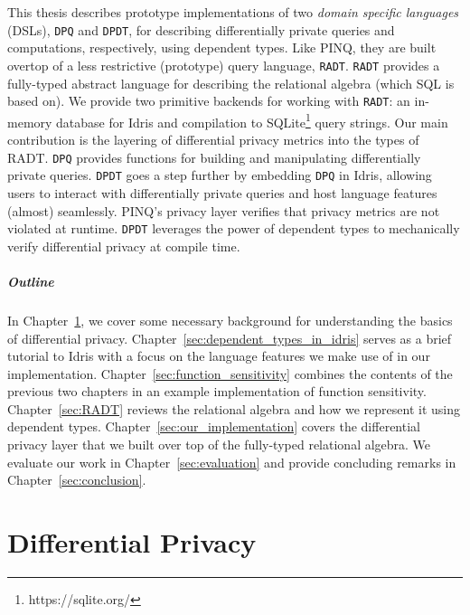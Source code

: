 \documentclass[12pt]{report}
\begin{document}
This thesis describes prototype implementations of two \textit{domain specific languages} (DSLs), \texttt{DPQ} and \texttt{DPDT}, for describing differentially private queries and computations, respectively, using dependent types.
Like PINQ, they are built overtop of a less restrictive (prototype) query language, \texttt{RADT}.
\texttt{RADT} provides a fully-typed abstract language for describing the relational algebra (which SQL is based on).
We provide two primitive backends for working with \texttt{RADT}: an in-memory database for Idris and compilation to SQLite\footnote{https://sqlite.org/} query strings.
Our main contribution is the layering of differential privacy metrics into the types of RADT.
\texttt{DPQ} provides functions for building and manipulating differentially private queries.
\texttt{DPDT} goes a step further by embedding \texttt{DPQ} in Idris, allowing users to interact with differentially private queries and host language features (almost) seamlessly.
PINQ's privacy layer verifies that privacy metrics are not violated at runtime.
\texttt{DPDT} leverages the power of dependent types to mechanically verify differential privacy at compile time.

\paragraph{Outline}


In Chapter~\ref{sec:differential_privacy}, we cover some necessary background for understanding the basics of differential privacy.
Chapter~\ref{sec:dependent_types_in_idris} serves as a brief tutorial to Idris with a focus on the language features we make use of in our implementation.
Chapter~\ref{sec:function_sensitivity} combines the contents of the previous two chapters in an example implementation of function sensitivity.
Chapter~\ref{sec:RADT} reviews the relational algebra and how we represent it using dependent types.
Chapter~\ref{sec:our_implementation} covers the differential privacy layer that we built over top of the fully-typed relational algebra.
We evaluate our work in Chapter~\ref{sec:evaluation} and provide concluding remarks in Chapter~\ref{sec:conclusion}.

\chapter{Differential Privacy}\label{sec:differential_privacy}
\end{document}

